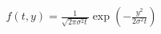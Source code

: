 \documentclass[preview]{standalone}
\begin{document}
\begin{align*}
f(t,y) = \frac{1}{\sqrt{2\pi \sigma^2 t}} \exp\left(-\frac{y^2}{2\sigma^2 t}\right)
\end{align*}
\end{document}

